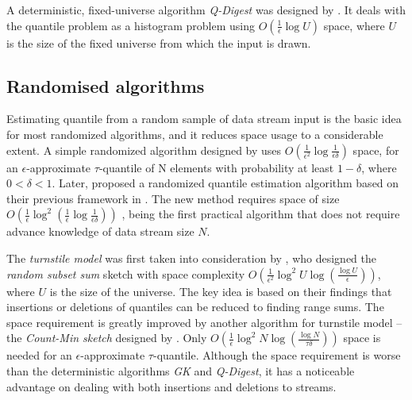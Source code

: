 A deterministic, fixed-universe algorithm \textit{Q-Digest} was designed by \citeauthor{shrivastavaMediansNewAggregation2004b}\cite{shrivastavaMediansNewAggregation2004b}. It deals with the quantile problem as a histogram problem using $O (\frac{1}{\epsilon}\log U)$ space, where $U$ is the size of the fixed universe from which the input is drawn.


\subsection{Randomised algorithms}
\label{randomised}

Estimating quantile from a random sample of data stream input is the basic idea for most randomized algorithms, and it reduces space usage to a considerable extent.
A simple randomized algorithm designed by \citeauthor{floydExpectedTimeBounds1975}\cite{floydExpectedTimeBounds1975} uses $O(\frac{1}{\epsilon^2} \log \frac{1}{\epsilon \delta})$ space, for an $\epsilon$-approximate $\tau$-quantile of N elements with probability at least $1 - \delta$, where $0 < \delta < 1$.
Later, \citeauthor{mankuRandomSamplingTechniques1999}\cite{mankuRandomSamplingTechniques1999} proposed a randomized quantile estimation algorithm based on their previous framework in \cite{mankuApproximateMediansOther1998}. The new method requires space of size 
$O(
    \frac{1}{\epsilon} \log^2 
    (\frac{1}{\epsilon} 
        \log \frac{1}{\epsilon \delta}
    )
)
$
, being the first practical algorithm that does not require advance knowledge of data stream size $N$.

The \textit{turnstile model} was first taken into consideration by \citeauthor{gilbertChapter40How2002}\cite{gilbertChapter40How2002}, who designed the \textit{random subset sum} sketch with space complexity 
$O(\frac{1}{\epsilon^2} \log^2 U \log (\frac{\log U}{\epsilon}))$, where $U$ is the size of the universe. 
The key idea is based on their findings that insertions or deletions of quantiles can be reduced to finding range sums.
The space requirement is greatly improved by another algorithm for turnstile model -- the \textit{Count-Min sketch} designed by \citeauthor{cormodeImprovedDataStream2005}\cite{cormodeImprovedDataStream2005}. Only 
$O(\frac{1}{\epsilon} \log^2 N \log (\frac{\log N}{\tau \delta}))$ space is needed for an $\epsilon$-approximate $\tau$-quantile. Although the space requirement is worse than the deterministic algorithms \textit{GK} and \textit{Q-Digest}, it has a noticeable advantage on dealing with both insertions and deletions to streams.


